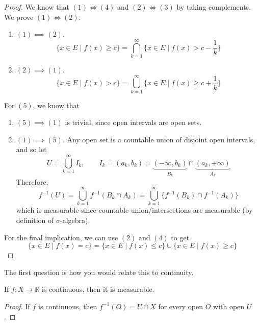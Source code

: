   \begin{proof}
    We know that $(1) \iff (4)$ and $(2) \iff (3)$ by taking complements. We prove $(1) \iff (2)$. 
    \begin{enumerate}
      \item $(1) \implies (2)$. 
      \begin{equation}
        \{x \in E \mid f(x) \geq c \} = \bigcap_{k=1}^\infty \{x \in E \mid f(x) > c - \frac{1}{k} \}
      \end{equation}

      \item $(2) \implies (1)$. 
      \begin{equation}
        \{ x \in E \mid f(x) > c\} = \bigcup_{k=1}^\infty \{x \in E \mid f(x) \geq c + \frac{1}{k} \}
      \end{equation}
    \end{enumerate}

    For $(5)$, we know that
    \begin{enumerate}
      \item $(5) \implies (1)$ is trivial, since open intervals are open sets. 
      \item $(1) \implies (5)$. Any open set is a countable union of disjoint open intervals, and so let 
      \begin{equation}
        U = \bigcup_{k=1}^\infty I_k, \qquad I_k = (a_k, b_k) = \underbrace{(-\infty, b_k)}_{B_k} \cap \underbrace{(a_k, +\infty)}_{A_k}
      \end{equation} 
      Therefore, 
      \begin{equation}
        f^{-1} (U) = \bigcup_{k=1}^\infty f^{-1} (B_k \cap A_k) = \bigcup_{k=1}^\infty \{f^{-1} (B_k) \cap f^{-1} (A_k) \}
      \end{equation}
      which is measurable since countable union/intersections are measurable (by definition of $\sigma$-algebra). 
    \end{enumerate}

    For the final implication, we can use $(2)$ and $(4)$ to get 
    \begin{equation}
      \{x \in E \mid f(x) = c\} = \{x \in E \mid f(x) \leq c \} \cup \{x \in E \mid f(x) \geq c \}
    \end{equation}
  \end{proof} 

  The first question is how you would relate this to continuity. 

  \begin{theorem}
    If $f: X \to \mathbb{R}$ is continuous, then it is measurable. 
  \end{theorem}
  \begin{proof}
    If $f$ is continuous, then $f^{-1} (O) = U \cap X$ for every open $O$ with open $U$. 
  \end{proof}

